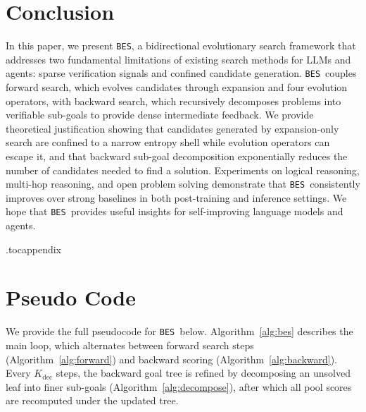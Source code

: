 \documentclass{llmxive}
\providecommand{\ours}{\texttt{BES}}
\begin{document}
\section{Conclusion}

In this paper, we present \ours, a bidirectional evolutionary search framework that addresses two fundamental limitations of existing search methods for LLMs and agents: sparse verification signals and confined candidate generation. \ours\ couples forward search, which evolves candidates through expansion and four evolution operators, with backward search, which recursively decomposes problems into verifiable sub-goals to provide dense intermediate feedback. We provide theoretical justification showing that candidates generated by expansion-only search are confined to a narrow entropy shell while evolution operators can escape it, and that backward sub-goal decomposition exponentially reduces the number of candidates needed to find a solution. Experiments on logical reasoning, multi-hop reasoning, and open problem solving demonstrate that \ours\ consistently improves over strong baselines in both post-training and inference settings. We hope that \ours\ provides useful insights for self-improving language models and agents.

% 




\appendix

\etocdepthtag.toc{appendix}
\tableofcontents
\vspace{1em}


\section{Pseudo Code}
\label{app:algo}

We provide the full pseudocode for \ours\ below. Algorithm~\ref{alg:bes} describes the main loop, which alternates between forward search steps (Algorithm~\ref{alg:forward}) and backward scoring (Algorithm~\ref{alg:backward}). Every $K_{\mathrm{dec}}$ steps, the backward goal tree is refined by decomposing an unsolved leaf into finer sub-goals (Algorithm~\ref{alg:decompose}), after which all pool scores are recomputed under the updated tree.
\end{document}
